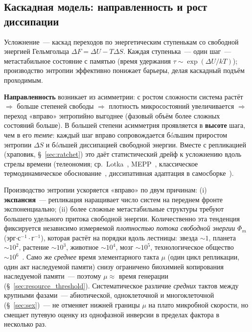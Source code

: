\documentclass[12pt,a4paper]{article}
\begin{document}
\subsection{Каскадная модель: направленность и рост диссипации}
\label{sec:cascade}

Усложнение~--- каскад переходов по энергетическим ступенькам со свободной энергией Гельмгольца $\Delta F = \Delta U - T\Delta S$. Каждая ступенька~--- один шаг~--- метастабильное состояние с памятью (время удержания $\tau \sim \exp(\Delta U/kT)$); производство энтропии эффективно понижает барьеры, делая каскадный подъём проходимым.

\textbf{Направленность} возникает из асимметрии: с ростом сложности система растёт $\Rightarrow$ больше степеней свободы $\Rightarrow$ плотность микросостояний увеличивается $\Rightarrow$ переход «вправо» энтропийно выгоднее (фазовый объём более сложных состояний больше). В большей степени асимметрия проявляется в \textbf{высоте} шага, чем в его \emph{темпе}: каждый шаг вправо сопровождается бóльшим приростом энтропии $\Delta S$ и бóльшей диссипацией свободной энергии. Вместе с репликацией (храповик, \S~\ref{sec:ratchet}) это даёт статистический дрейф к усложнению вдоль стрелы времени (телеономия; ср.~Lotka~\cite{Lotka1922}, MEPP~\cite{Martyushev}, классическое термодинамическое обоснование~\cite{SchneiderKay1994}, диссипативная адаптация в самосборке~\cite{England2015}).

Производство энтропии ускоряется «вправо» по двум причинам: (i) \textbf{экспансия}~--- репликация наращивает число систем на переднем фронте экспоненциально; (ii) более сложные метастабильные структуры требуют большего удельного притока свободной энергии. Количественно эта тенденция фиксируется независимо измеряемой \emph{плотностью потока свободной энергии} $\Phi_m$ (эрг$\cdot$с$^{-1}\cdot$г$^{-1}$), которая растёт на порядки вдоль лестницы: звезда $\sim1$, планета $\sim10^2$, растение $\sim10^3$, животное $\sim10^4$, мозг $\sim10^5$, технологическое общество $\sim10^6$~\cite{Chaisson2011}. Само же \emph{среднее} время элементарного такта $\mu$ (один цикл репликации, один акт наследуемой памяти) снизу ограничено биохимией копирования наследуемой памяти~--- поэтому $\mu \approx$ время генерации (\S~\ref{sec:resource_threshold}). Систематическое различие \emph{средних} тактов между крупными фазами~--- абиотической, одноклеточной и многоклеточной (\S~\ref{sec:sex})~--- не отменяет нижней границы $\mu$ на плато микробной скорости, но смещает путевую оценку из однофазной инверсии в пределах фактора в несколько раз.
\end{document}
